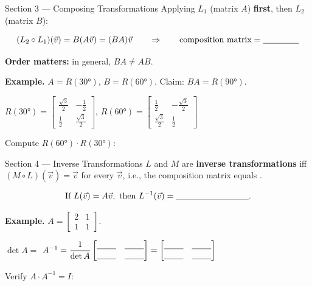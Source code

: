 \documentclass[10pt]{article}
\begin{document}
\begin{notesbox}{Section 3 --- Composing Transformations}
\small
Applying $L_1$ (matrix $A$) \textbf{first}, then $L_2$ (matrix $B$):

\[
  (L_2 \circ L_1)(\vec v) = B(A\vec v) = (BA)\vec v
  \qquad \Rightarrow \qquad \text{composition matrix} = \blank{1.5cm}
\]

\textbf{Order matters:} in general, $BA \ne AB$.

\vspace{0.08in}
\textbf{Example.} $A = R(30°)$, $B = R(60°)$. Claim: $BA = R(90°)$.

\hspace{1em}
$R(30°) = \begin{bmatrix}\frac{\sqrt{3}}{2} & -\frac{1}{2} \\[3pt] \frac{1}{2} & \frac{\sqrt{3}}{2}\end{bmatrix}$,\quad
$R(60°) = \begin{bmatrix}\frac{1}{2} & -\frac{\sqrt{3}}{2} \\[3pt] \frac{\sqrt{3}}{2} & \frac{1}{2}\end{bmatrix}$

\vspace{0.08in}
\hspace{1em} Compute $R(60°)\cdot R(30°)$: 
\end{notesbox}

\vspace{0.06in}

\begin{notesbox}{Section 4 --- Inverse Transformations}
\small
$L$ and $M$ are \textbf{inverse transformations} iff $(M \circ L)(\vec v) = \vec v$ for every $\vec v$,
i.e., the composition matrix equals \blank{1.2cm}.

\[
  \text{If } L(\vec v) = A\vec v, \text{ then } L^{-1}(\vec v) = \blank{3cm}.
\]

\textbf{Example.} $A = \begin{bmatrix}2&1\\1&1\end{bmatrix}$.

\hspace{1em} $\det A = $ \blank{1.5cm} \qquad
$A^{-1} = \dfrac{1}{\det A}\begin{bmatrix}\blank{0.8cm}&\blank{0.8cm}\\\blank{0.8cm}&\blank{0.8cm}\end{bmatrix}
= \begin{bmatrix}\blank{0.8cm}&\blank{0.8cm}\\\blank{0.8cm}&\blank{0.8cm}\end{bmatrix}$

\vspace{0.08in}
\hspace{1em} Verify $A\cdot A^{-1} = I$: 
\end{notesbox}
\end{document}
